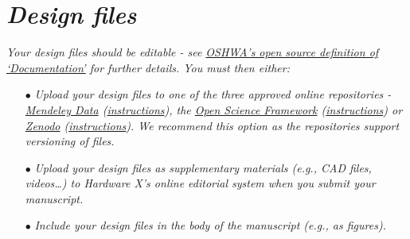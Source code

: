 \documentclass[11pt, letterpaper]{article}
\begin{document}
\section*{\textit{Design files}}


\textit{Your design files should be editable - see \href{https://www.oshwa.org/definition/}{OSHWA’s open source definition of ‘Documentation’} for further details. You must then either:}
\begin{itemize}
\item[$\bullet$]{\it Upload your design files to one of the three approved online repositories - \href{https://data.mendeley.com/}{Mendeley Data} (\href{https://doi.org/10.5281/zenodo.3346799}{instructions}), the \href{https://osf.io/}{Open Science Framework} (\href{https://osf.io/wgk7q/wiki/home/}{instructions}) or \href{https://zenodo.org/}{Zenodo} (\href{https://doi.org/10.5281/zenodo.3346799}{instructions}). We recommend this option as the repositories support versioning of files.}
\item[$\bullet$]{\it Upload your design files as supplementary materials (e.g., CAD files, videos…) to Hardware X’s online editorial system when you submit your manuscript.}
\item[$\bullet$]{\it Include your design files in the body of the manuscript (e.g., as figures).}
\end{itemize}
\end{document}
